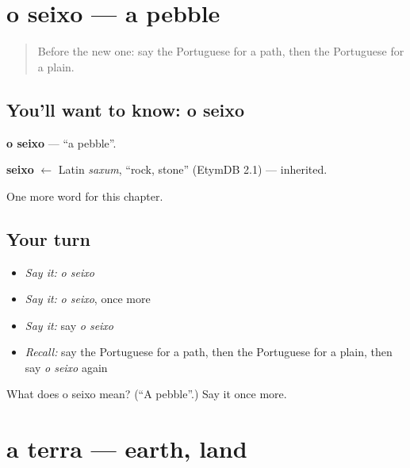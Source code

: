 \section[o seixo]{o seixo — a pebble}

\label{lesson:PT-C164-seixo}



\begin{quote}
Before the new one: say the Portuguese for a path, then the Portuguese for a plain.
\end{quote}

\subsection*{You'll want to know: o seixo}
\textbf{o seixo} — \textquotedblleft{}a pebble\textquotedblright{}.

\begin{cousinweb}
\textbf{seixo} $\leftarrow$ Latin \emph{saxum}, \textquotedblleft{}rock, stone\textquotedblright{} (EtymDB 2.1) — inherited.
\end{cousinweb}

\begin{grammarlens}[title={What you've built}]
One more word for this chapter.
\end{grammarlens}

\subsection*{Your turn}
\begin{itemize}
\raggedright
  \item \emph{Say it:} \emph{o seixo}
  \item \emph{Say it:} \emph{o seixo}, once more
  \item \emph{Say it:} say \emph{o seixo}
  \item \emph{Recall:} say the Portuguese for a path, then the Portuguese for a plain, then say \emph{o seixo} again
\end{itemize}

\begin{tcolorbox}[breakable,colback=teal!4,colframe=teal!35!black,title={Before you move on}]
What does o seixo mean? (\textquotedblleft{}A pebble\textquotedblright{}.) Say it once more.
\end{tcolorbox}
\section[a terra]{a terra — earth, land}

